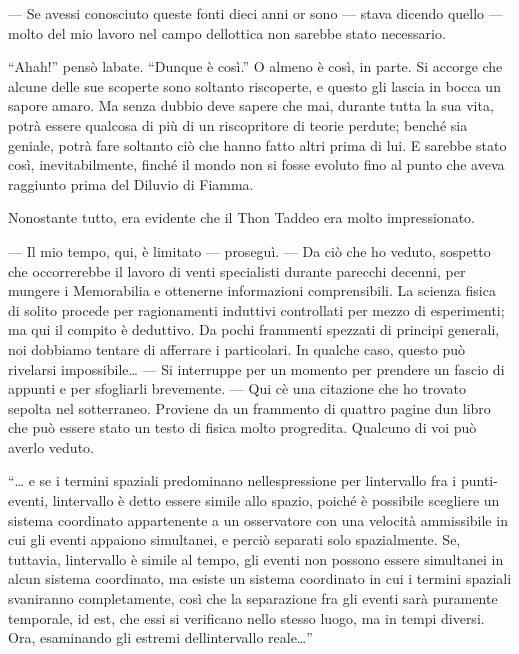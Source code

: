 --- Se avessi conosciuto queste fonti dieci anni or sono --- stava
dicendo quello --- molto del mio lavoro nel campo
dell\textquotesingle ottica non sarebbe stato necessario.

``Ahah!'' pensò l\textquotesingle abate. ``Dunque è così.'' O almeno è
così, in parte. Si accorge che alcune delle sue scoperte sono soltanto
riscoperte, e questo gli lascia in bocca un sapore amaro. Ma senza
dubbio deve sapere che mai, durante tutta la sua vita, potrà essere
qualcosa di più di un riscopritore di teorie perdute; benché sia
geniale, potrà fare soltanto ciò che hanno fatto altri prima di lui. E
sarebbe stato così, inevitabilmente, finché il mondo non si fosse
evoluto fino al punto che aveva raggiunto prima del Diluvio di Fiamma.

Nonostante tutto, era evidente che il Thon Taddeo era molto
impressionato.

--- Il mio tempo, qui, è limitato --- proseguì. --- Da ciò che ho
veduto, sospetto che occorrerebbe il lavoro di venti specialisti durante
parecchi decenni, per mungere i Memorabilia e ottenerne informazioni
comprensibili. La scienza fisica di solito procede per ragionamenti
induttivi controllati per mezzo di esperimenti; ma qui il compito è
deduttivo. Da pochi frammenti spezzati di principi generali, noi
dobbiamo tentare di afferrare i particolari. In qualche caso, questo può
rivelarsi impossibile\ldots{} --- Si interruppe per un momento per
prendere un fascio di appunti e per sfogliarli brevemente. --- Qui
c\textquotesingle è una citazione che ho trovato sepolta nel
sotterraneo. Proviene da un frammento di quattro pagine
d\textquotesingle un libro che può essere stato un testo di fisica molto
progredita. Qualcuno di voi può averlo veduto.

``\ldots{} e se i termini spaziali predominano
nell\textquotesingle espressione per l\textquotesingle intervallo fra i
punti-eventi, l\textquotesingle intervallo è detto essere simile allo
spazio, poiché è possibile scegliere un sistema coordinato appartenente
a un osservatore con una velocità ammissibile in cui gli eventi appaiono
simultanei, e perciò separati solo spazialmente. Se, tuttavia,
l\textquotesingle intervallo è simile al tempo, gli eventi non possono
essere simultanei in alcun sistema coordinato, ma esiste un sistema
coordinato in cui i termini spaziali svaniranno completamente, così che
la separazione fra gli eventi sarà puramente temporale, id est, che essi
si verificano nello stesso luogo, ma in tempi diversi. Ora, esaminando
gli estremi dell\textquotesingle intervallo reale\ldots''


